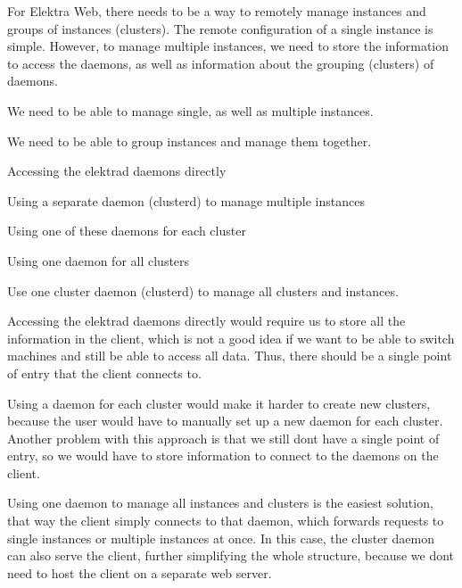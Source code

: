 For Elektra Web, there needs to be a way to remotely manage instances and groups of instances (clusters). The remote configuration of a single instance is simple. However, to manage multiple instances, we need to store the information to access the daemons, as well as information about the grouping (clusters) of daemons.


\begin{DoxyItemize}
\item We need to be able to manage single, as well as multiple instances.
\item We need to be able to group instances and manage them together.
\end{DoxyItemize}


\begin{DoxyItemize}
\item Accessing the elektrad daemons directly
\item Using a separate daemon (clusterd) to manage multiple instances
\begin{DoxyItemize}
\item Using one of these daemons for each cluster
\item Using one daemon for all clusters
\end{DoxyItemize}
\end{DoxyItemize}

Use one cluster daemon (clusterd) to manage all clusters and instances.

Accessing the elektrad daemons directly would require us to store all the information in the client, which is not a good idea if we want to be able to switch machines and still be able to access all data. Thus, there should be a single point of entry that the client connects to.

Using a daemon for each cluster would make it harder to create new clusters, because the user would have to manually set up a new daemon for each cluster. Another problem with this approach is that we still don\textquotesingle{}t have a single point of entry, so we would have to store information to connect to the daemons on the client.

Using one daemon to manage all instances and clusters is the easiest solution, that way the client simply connects to that daemon, which forwards requests to single instances or multiple instances at once. In this case, the cluster daemon can also serve the client, further simplifying the whole structure, because we don\textquotesingle{}t need to host the client on a separate web server.

